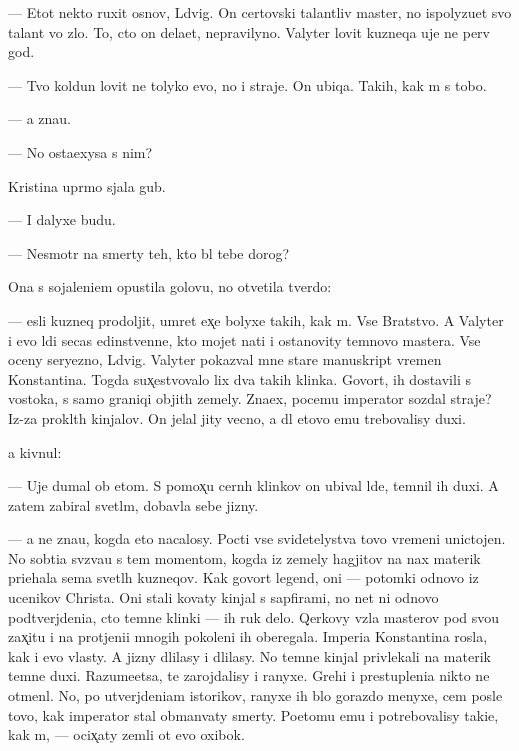 \documentclass[10pt]{book}
\begin{document}
— Etot nekto ruxit osnov{\yi}, L{\iu}dvig. On certovski talantliv{\yi}{\y} master, no ispolyzu{\y}et svo{\y} talant vo zlo. To, cto on dela{\y}et, nepravilyno. Valyter lovit kuzneqa uje ne perv{\yi}{\y} god.

— Tvo{\y} koldun lovit ne tolyko {\y}evo, no i straje{\y}. On ubi{\y}qa. Takih, kak m{\yi} s tobo{\y}.

— {\Y}a zna{\y}u.

— No osta{\y}exysa s nim?

Kristina upr{\ia}mo sjala gub{\yi}.

— I dalyxe budu.

— Nesmotr{\ia} na smerty teh, kto b{\yi}l tebe dorog?

Ona s sojaleni{\y}em opustila golovu, no otvetila tverdo:

— {\Y}esli kuzneq prodoljit, umret {\y}ex̨e bolyxe takih, kak m{\yi}. Vse Bratstvo. A Valyter i {\y}evo l{\iu}di se{\y}cas {\y}edinstvenn{\yi}{\y}e, kto mojet na{\y}ti i ostanovity temnovo mastera. Vse oceny seryezno, L{\iu}dvig. Valyter pokaz{\yi}val mne star{\yi}{\y}e manuskript{\yi} vremen Konstantina. Togda sux̨estvovalo lix dva takih klinka. Govor{\ia}t, ih dostavili s vostoka, s samo{\y} graniqi objit{\yi}h zemely. Zna{\y}ex, pocemu imperator sozdal straje{\y}? Iz-za prokl{\ia}t{\yi}h kinjalov. On jelal jity vecno, a dl{\ia} etovo {\y}emu trebovalisy duxi.

{\Y}a kivnul:

— Uje dumal ob etom. S pomox̨{\y}u cern{\yi}h klinkov on ubival l{\iu}de{\y}, temnil ih duxi. A zatem zabiral svetl{\yi}m, dobavl{\ia}{\y}a sebe jizny.

— {\Y}a ne zna{\y}u, kogda eto nacalosy. Pocti vse svidetelystva tovo vremeni unictojen{\yi}. No sob{\yi}ti{\y}a sv{\ia}z{\yi}va{\y}u s tem momentom, kogda iz zemely hagjitov na nax materik pri{\y}ehala sem{\y}a svetl{\yi}h kuzneqov. Kak govor{\ia}t legend{\yi}, oni — potomki odnovo iz ucenikov Christa. Oni stali kovaty kinjal{\yi} s sapfirami, no net ni odnovo podtverjdeni{\y}a, cto temn{\yi}{\y}e klinki — ih ruk delo. Qerkovy vz{\ia}la masterov pod svo{\y}u zax̨itu i na prot{\ia}jeni{\y}i mnogih pokoleni{\y} ih oberegala. Imperi{\y}a Konstantina rosla, kak i {\y}evo vlasty. A jizny dlilasy i dlilasy. No temn{\yi}{\y}e kinjal{\yi} privlekali na materik temn{\yi}{\y}e duxi. Razume{\y}etsa, te zarojdalisy i ranyxe. Grehi i prestupleni{\y}a nikto ne otmen{\ia}l. No, po utverjdeni{\y}am istorikov, ranyxe ih b{\yi}lo gorazdo menyxe, cem posle tovo, kak imperator stal obman{\yi}vaty smerty. Poetomu {\y}emu i potrebovalisy taki{\y}e, kak m{\yi}, — ocix̨aty zemli ot {\y}evo oxibok.
\end{document}
